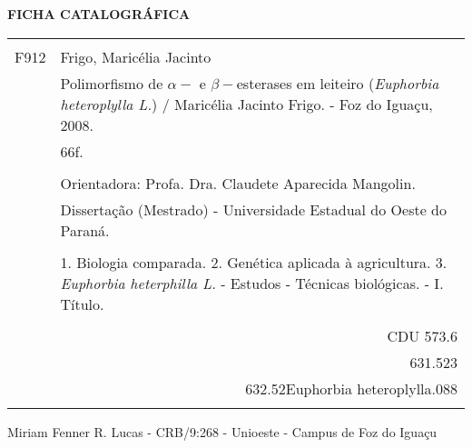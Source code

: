 
\newpage \footnotesize
\thispagestyle{plain}
\singlespacing

\vspace*{\fill}
\begin{center} 

\textbf{FICHA CATALOGRÁFICA} 

\newcommand{\fcindent}{\hspace*{0.5cm}}
\vspace{0.25cm}
\begin{tabular}{|cp{11cm}|} \hline
   & \\
  F912 &  Frigo, Maricélia Jacinto \\
  & \fcindent Polimorfismo de $\alpha-$ e $\beta-$esterases
    em leiteiro ({\em Euphorbia heteroplylla L.}) / 
    Maricélia Jacinto Frigo. - Foz do Iguaçu, 2008. \\
  & \fcindent 66f. \\
  &  \\
  & \fcindent Orientadora: Profa. Dra. Claudete Aparecida Mangolin. \\
  & \fcindent Dissertação (Mestrado) - Universidade Estadual do Oeste do Paraná. \\
  & \\
  & \fcindent 1. Biologia comparada. 2. Genética aplicada à agricultura. 
     3. {\em Euphorbia heterphilla L.} - Estudos - Técnicas biológicas. - I. Título. \\
  & \\
  & \multicolumn{1}{r|}{CDU 573.6} \\
  & \multicolumn{1}{r|}{631.523} \\
  & \multicolumn{1}{r|}{632.52Euphorbia heteroplylla.088} \\ 
  & \\ \hline
\end{tabular} 

\vspace*{2.5mm}
Miriam Fenner R. Lucas - CRB/9:268 - Unioeste - Campus de Foz do Iguaçu
\end{center}
\vspace*{2cm}
\onehalfspacing

